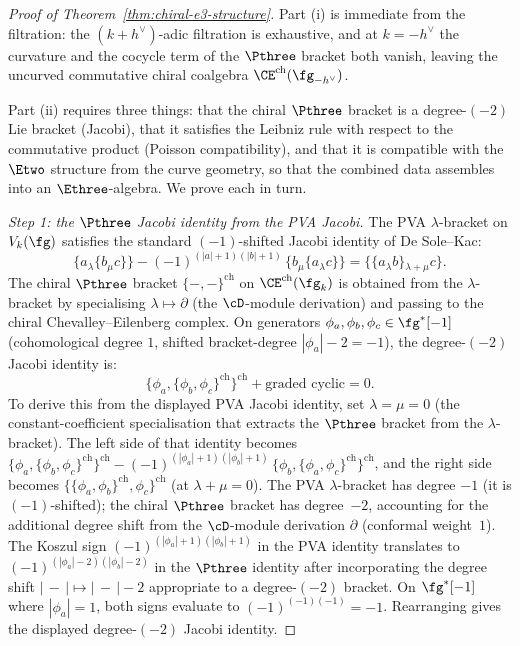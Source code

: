\begin{proof}[Proof of Theorem~\ref{thm:chiral-e3-structure}]
Part (i) is immediate from the filtration: the $(k+h^\vee)$-adic
filtration is exhaustive, and at $k = -h^\vee$ the curvature
and the cocycle term of the $\Pthree$ bracket both vanish,
leaving the uncurved commutative chiral coalgebra
$\CE^{\mathrm{ch}}(\fg_{-h^\vee})$.

Part (ii) requires three things: that the chiral
$\Pthree$ bracket is a degree-$(-2)$ Lie bracket
(Jacobi), that it satisfies the Leibniz rule with respect
to the commutative product (Poisson compatibility), and
that it is compatible with the $\Etwo$ structure from
the curve geometry, so that the combined data assembles
into an $\Ethree$-algebra. We prove each in turn.

\textit{Step 1: the $\Pthree$ Jacobi identity from the
PVA Jacobi.}
The PVA $\lambda$-bracket on $V_k(\fg)$ satisfies the
standard $(-1)$-shifted Jacobi identity of De Sole--Kac:
\begin{equation}\label{eq:pva-jacobi-recall}
 \{a \mathbin{{}_\lambda} \{b \mathbin{{}_\mu} c\}\}
 - (-1)^{(|a|+1)(|b|+1)}\,
 \{b \mathbin{{}_\mu} \{a \mathbin{{}_\lambda} c\}\}
 = \{\{a \mathbin{{}_\lambda} b\}
 \mathbin{{}_{{\lambda+\mu}}} c\}.
\end{equation}
The chiral $\Pthree$ bracket
$\{-,-\}^{\mathrm{ch}}$
on $\CE^{\mathrm{ch}}(\fg_k)$ is obtained from the
$\lambda$-bracket by specialising $\lambda \mapsto \partial$
(the $\cD$-module derivation) and passing to the chiral
Chevalley--Eilenberg complex. On generators
$\phi_a, \phi_b, \phi_c \in \fg^*[-1]$
(cohomological degree $1$, shifted bracket-degree
$|\phi_a| - 2 = -1$), the degree-$(-2)$ Jacobi identity
is:
\begin{equation}\label{eq:p3-jacobi}
 \{\phi_a, \{\phi_b, \phi_c\}^{\mathrm{ch}}\}^{\mathrm{ch}}
 + \text{graded cyclic}
 = 0.
\end{equation}
To derive this from the displayed PVA Jacobi identity, set
$\lambda = \mu = 0$ (the constant-coefficient specialisation
that extracts the $\Pthree$ bracket from the
$\lambda$-bracket). The left side of that identity becomes
$\{\phi_a, \{\phi_b, \phi_c\}^{\mathrm{ch}}\}^{\mathrm{ch}}
- (-1)^{(|\phi_a|+1)(|\phi_b|+1)}\,
\{\phi_b, \{\phi_a, \phi_c\}^{\mathrm{ch}}\}^{\mathrm{ch}}$,
and the right side becomes
$\{\{\phi_a, \phi_b\}^{\mathrm{ch}},
\phi_c\}^{\mathrm{ch}}$ (at $\lambda + \mu = 0$).
The PVA $\lambda$-bracket has degree $-1$ (it is
$(-1)$-shifted); the chiral $\Pthree$ bracket has
degree~$-2$, accounting for the additional degree shift
from the $\cD$-module derivation $\partial$ (conformal
weight~$1$). The Koszul sign
$(-1)^{(|\phi_a|+1)(|\phi_b|+1)}$ in the PVA identity
translates to $(-1)^{(|\phi_a|-2)(|\phi_b|-2)}$ in the
$\Pthree$ identity after incorporating the degree shift
$|\,{-}\,| \mapsto |\,{-}\,| - 2$ appropriate to a
degree-$(-2)$ bracket. On $\fg^*[-1]$ where
$|\phi_a| = 1$, both signs evaluate to
$(-1)^{(-1)(-1)} = -1$. Rearranging gives the displayed
degree-$(-2)$ Jacobi identity.


\end{proof}
